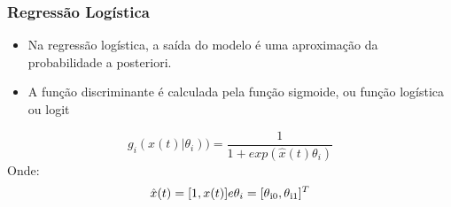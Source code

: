 \documentclass{beamer}
\begin{document}
\begin{frame}
\frametitle{Regressão Logística}
\begin{itemize} 
\item Na regressão logística, a saída do modelo é uma aproximação da
probabilidade a posteriori.
\item A função discriminante é calculada pela função sigmoide, ou função logística ou logit
\end{itemize}

\begin{theorem}
\[g_i(x(t)|\theta_i))  = \frac{1}{1+ exp(\hat{x}(t)\theta_i)}\]
Onde:
\[\hat{x}(t) = [1,x(t)] e \theta_i=[\theta\textsubscript{i0},\theta\textsubscript{i1}]^T\]

\end{theorem}

\end{frame}
\end{document}
